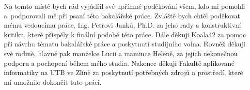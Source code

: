 \documentclass[a4paper,12pt]{article}
\begin{document}
\titulnistrana

\zadani

\prohlaseni

\abstraktaklicovaslova


\clearpage
\thispagestyle{empty}
Na tomto místě bych rád vyjádřil své upřímné poděkování všem, kdo mi pomohli a podporovali mě při psaní této bakalářské práce. Zvláště bych chtěl poděkovat mému vedoucímu práce, Ing. Petrovi Janků, Ph.D. za jeho rady a konstruktivní kritiku, které přispěly k finální podobě této práce. Dále děkuji Koala42 za pomoc při návrhu tématu bakalářské práce a poskytnutí studijního volna. Rovněž děkuji své rodině, hlavně pak manželce Lucii a mamince Heleně, za jejich nekonečnou podporu a pochopení během mého studia. Nakonec děkuji Fakultě aplikované informatiky na UTB ve Zlíně za poskytnutí potřebných zdrojů a prostředí, které mi umožnilo dokončit tuto práci.


\obsah  %


\OdsazovaniOdstavcuStart %


\OdsazovaniOdstavcuStop


\seznamlitbib




\seznamobr  %


\seznamtab  %




\end{document}

